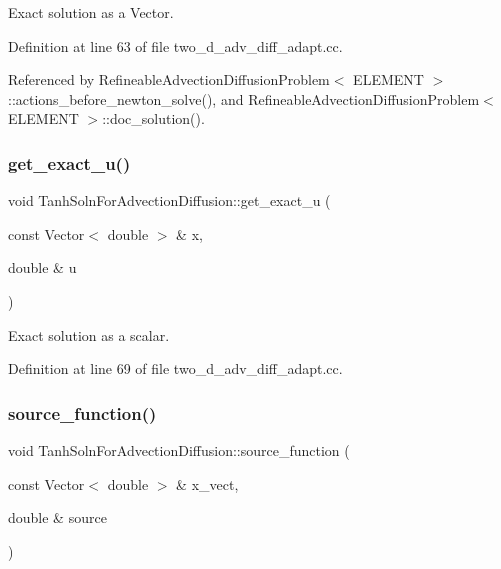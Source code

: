 Exact solution as a Vector. 



Definition at line 63 of file two\+\_\+d\+\_\+adv\+\_\+diff\+\_\+adapt.\+cc.



Referenced by Refineable\+Advection\+Diffusion\+Problem$<$ E\+L\+E\+M\+E\+N\+T $>$\+::actions\+\_\+before\+\_\+newton\+\_\+solve(), and Refineable\+Advection\+Diffusion\+Problem$<$ E\+L\+E\+M\+E\+N\+T $>$\+::doc\+\_\+solution().

\mbox{\label{namespaceTanhSolnForAdvectionDiffusion_af302dc41c1e494b3430fe6654bd1fd39}} 
\subsubsection{\texorpdfstring{get\+\_\+exact\+\_\+u()}{get\_exact\_u()}\hspace{0.1cm}{\footnotesize\ttfamily [2/2]}}
{\footnotesize\ttfamily void Tanh\+Soln\+For\+Advection\+Diffusion\+::get\+\_\+exact\+\_\+u (\begin{DoxyParamCaption}\item[{const Vector$<$ double $>$ \&}]{x,  }\item[{double \&}]{u }\end{DoxyParamCaption})}



Exact solution as a scalar. 



Definition at line 69 of file two\+\_\+d\+\_\+adv\+\_\+diff\+\_\+adapt.\+cc.

\mbox{\label{namespaceTanhSolnForAdvectionDiffusion_aaa1aa95713b02b211812fdd18eeaa369}} 
\subsubsection{\texorpdfstring{source\+\_\+function()}{source\_function()}}
{\footnotesize\ttfamily void Tanh\+Soln\+For\+Advection\+Diffusion\+::source\+\_\+function (\begin{DoxyParamCaption}\item[{const Vector$<$ double $>$ \&}]{x\+\_\+vect,  }\item[{double \&}]{source }\end{DoxyParamCaption})}



